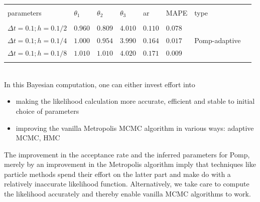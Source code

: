 \documentclass[graybox]{svmult}
\begin{document}
\vspace{-4mm}
\setlength{\tabcolsep}{8pt}
\begin{table}[!htbp] \centering 

\begin{tabular}{llllllll} 
\\[-1.8ex]\hline 
\hline \\[-1.8ex] 
parameters & $\theta_1$ & $\theta_2$ & $\theta_3$ & ar & MAPE & type \\ 
\hline \\[-1.8ex] 
$\Delta t = 0.1; h = 0.1/2$ & $0.960$ & $0.809$ & $4.010$ & $0.110$ & $0.078$ & \\ 
$\Delta t = 0.1; h = 0.1/4$ & $1.000$ & $0.954$ & $3.990$ & $0.164$ & $0.017$ & Pomp-adaptive \\ 
$\Delta t = 0.1; h = 0.1/8$ & $1.010$ & $1.010$ & $4.020$ & $0.171$ & $0.009$ & \\ 
\hline \\[-1.8ex] 
\end{tabular} 
\end{table} 
\vspace{-5mm}
\\
In this Bayesian computation, one can either invest effort into 
\begin{itemize}
\item making the likelihood calculation more accurate, efficient and stable to initial choice of parameters
\item improving the vanilla Metropolis MCMC algorithm in various ways: adaptive MCMC, HMC \cite{gelman2014bayesian}
\end{itemize}
The improvement in the acceptance rate and the inferred parameters for Pomp, merely by an improvement in the Metropolis algorithm imply that techniques like particle methods spend their effort on the latter part and make do with a relatively inaccurate likelihood function. Alternatively, we take care to compute the likelihood accurately and thereby enable vanilla MCMC algorithms to work.
\end{document}

